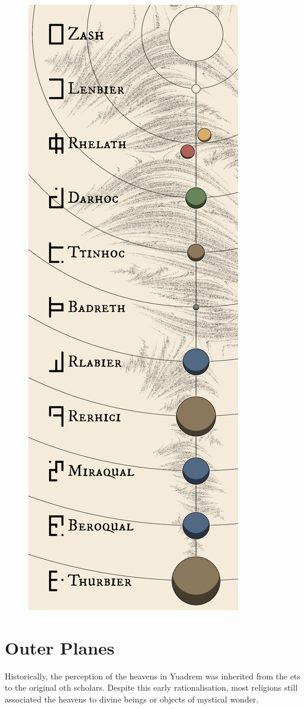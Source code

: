 \begin{figure}[H]
    \centering \includegraphics{01yuadrem/img/41solarsystem.png}
\end{figure}
\section{Outer Planes}
Historically, the perception of the heavens in Yuadrem was inherited from the ets to the original oth scholars.
Despite this early rationalisation, most religions still associated the heavens to divine beings or objects of mystical wonder.




